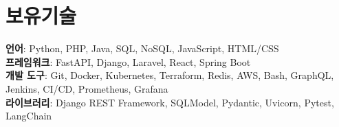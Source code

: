 \documentclass[letterpaper,11pt]{article}
\begin{document}
%
    \section{보유기술}
    \begin{itemize}[leftmargin=0.15in, label={}]
        \small{\item{
            \textbf{언어}{: Python, PHP, Java, SQL, NoSQL, JavaScript, HTML/CSS} \\
            \textbf{프레임워크}{: FastAPI, Django, Laravel, React, Spring Boot} \\
            \textbf{개발 도구}{: Git, Docker, Kubernetes, Terraform, Redis, AWS, Bash, GraphQL, Jenkins, CI/CD, Prometheus, Grafana} \\
            \textbf{라이브러리}{: Django REST Framework, SQLModel, Pydantic, Uvicorn, Pytest, LangChain}
        }}
    \end{itemize}


\end{document}
